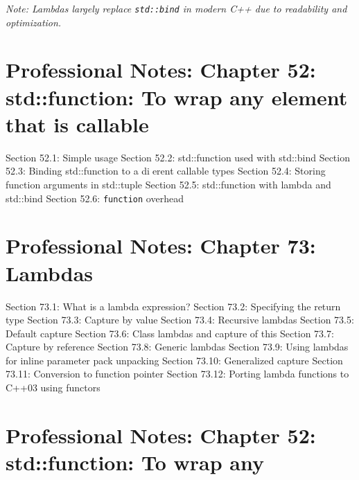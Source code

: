 \emph{Note: Lambdas largely replace \passthrough{\lstinline!std::bind!}
in modern C++ due to readability and optimization.}

\hypertarget{professional-notes-chapter-52-stdfunction-to-wrap-any-element-that-is-callable}{%
\chapter{Professional Notes: Chapter 52: std::function: To wrap any
element that is
callable}\label{professional-notes-chapter-52-stdfunction-to-wrap-any-element-that-is-callable}}

Section 52.1: Simple usage Section 52.2: std::function used with
std::bind Section 52.3: Binding std::function to a dierent callable
types Section 52.4: Storing function arguments in std::tuple Section
52.5: std::function with lambda and std::bind Section 52.6:
\passthrough{\lstinline!function!} overhead

\hypertarget{professional-notes-chapter-73-lambdas}{%
\chapter{Professional Notes: Chapter 73:
Lambdas}\label{professional-notes-chapter-73-lambdas}}

Section 73.1: What is a lambda expression? Section 73.2: Specifying the
return type Section 73.3: Capture by value Section 73.4: Recursive
lambdas Section 73.5: Default capture Section 73.6: Class lambdas and
capture of this Section 73.7: Capture by reference Section 73.8: Generic
lambdas Section 73.9: Using lambdas for inline parameter pack unpacking
Section 73.10: Generalized capture Section 73.11: Conversion to function
pointer Section 73.12: Porting lambda functions to C++03 using functors

\hypertarget{professional-notes-chapter-52-stdfunction-to-wrap-any}{%
\chapter{Professional Notes: Chapter 52: std::function: To wrap
any}\label{professional-notes-chapter-52-stdfunction-to-wrap-any}}

